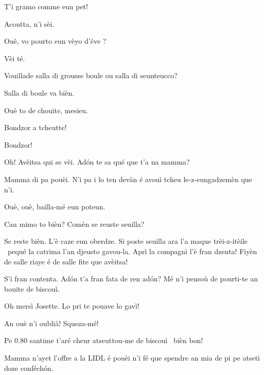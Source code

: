 \begin{drama}
\Casimirspeaks {} T'i gramo comme eun pet!

\PersEmpourtantaspeaks {} Acoutta, n’i sèi.

\Eunfeurmispeaks Ouè,  vo pourto eun vèyo d'éve \bicchiere ?

\PersEmpourtantaspeaks Vèi té.

\Eunfeurmispeaks Vouillade salla di grousse boule ou salla di seunteucco?

\PersEmpourtantaspeaks Salla di boule va bièn.

\Eunfeurmispeaks Ouè to de chouite, mesieu.


\Feliespeaks Bondzor a tcheutte!

\Casimirspeaks {} Bondzor!

\Gerominespeaks Oh! Avèitsa qui se vèi. Ad\'on te sa qué que t’a na mamma?

\Feliespeaks Mamma di pa pouèi. N’i pa i lo ten devàn é avouì tcheu le-z-eungadzemèn que n'i.

\Gerominespeaks Ouè, ouè, bailla-mé eun poteun.


\Feliespeaks Can mimo to bièn? Comèn se reuste seuilla?

\Gerominespeaks {} Se reste bièn. L’è caze eun oberdze. Si poste seuilla ara l’a maque trèi-z-itèile \stella\ pequé la catrima l’an djeusto gavou-la.  Aprì la compagnì l’è fran dzenta! Fiyèn de salle riaye é de salle fite que avèitsa!

\Feliespeaks S’i fran contenta. Ad\'on t’a fran fata de ren ad\'on? Mé n'i pensoù de pourti-te an bouite de biscouì.

\Gerominespeaks Oh mersì Josette.  Lo pri te pouave lo gavì!

\Feliespeaks An ouè n’i oublià! Squeza-mé!

\Gerominespeaks Pe $0.80$ santime t’aré cheur atseuttou-me de biscouì \biscotto\ bièn bon!

\Feliespeaks Mamma n’ayet l’offre a la LIDL é pouèi n’i fé que spendre an mia de pi pe atsetì doze conféch\'on.


\end{drama}
